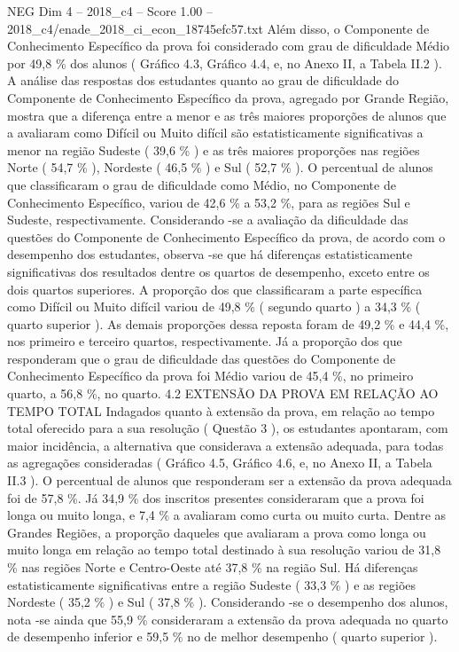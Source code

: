 \begin{textsample}{NEG Dim 4 – 2018\_c4 – Score 1.00 – 2018\_c4/enade\_2018\_ci\_econ\_18745efc57.txt}
Além disso, o Componente de Conhecimento Específico da prova foi considerado com grau de dificuldade Médio por 49,8 \% dos alunos ( Gráfico 4.3, Gráfico 4.4, e, no Anexo II, a Tabela II.2 ).
A análise das respostas dos estudantes quanto ao grau de dificuldade do Componente de Conhecimento Específico da prova, agregado por Grande Região, mostra que a diferença entre a menor e as três maiores proporções de alunos que a avaliaram como Difícil ou Muito difícil são estatisticamente significativas a menor na região Sudeste ( 39,6 \% ) e as três maiores proporções nas regiões Norte ( 54,7 \% ), Nordeste ( 46,5 \% ) e Sul ( 52,7 \% ).
O percentual de alunos que classificaram o grau de dificuldade como Médio, no Componente de Conhecimento Específico, variou de 42,6 \% a 53,2 \%, para as regiões Sul e Sudeste, respectivamente.
Considerando -se a avaliação da dificuldade das questões do Componente de Conhecimento Específico da prova, de acordo com o desempenho dos estudantes, observa -se que há diferenças estatisticamente significativas dos resultados dentre os quartos de desempenho, exceto entre os dois quartos superiores.
A proporção dos que classificaram a parte específica como Difícil ou Muito difícil variou de 49,8 \% ( segundo quarto ) a 34,3 \% ( quarto superior ).
As demais proporções dessa reposta foram de 49,2 \% e 44,4 \%, nos primeiro e terceiro quartos, respectivamente.
Já a proporção dos que responderam que o grau de dificuldade das questões do Componente de Conhecimento Específico da prova foi Médio variou de 45,4 \%, no primeiro quarto, a 56,8 \%, no quarto. 4.2 EXTENSÃO DA PROVA EM RELAÇÃO AO TEMPO TOTAL Indagados quanto à extensão da prova, em relação ao tempo total oferecido para a sua resolução ( Questão 3 ), os estudantes apontaram, com maior incidência, a alternativa que considerava a extensão adequada, para todas as agregações consideradas ( Gráfico 4.5, Gráfico 4.6, e, no Anexo II, a Tabela II.3 ).
O percentual de alunos que responderam ser a extensão da prova adequada foi de 57,8 \%.
Já 34,9 \% dos inscritos presentes consideraram que a prova foi longa ou muito longa, e 7,4 \% a avaliaram como curta ou muito curta.
Dentre as Grandes Regiões, a proporção daqueles que avaliaram a prova como longa ou muito longa em relação ao tempo total destinado à sua resolução variou de 31,8 \% nas regiões Norte e Centro-Oeste até 37,8 \% na região Sul.
Há diferenças estatisticamente significativas entre a região Sudeste ( 33,3 \% ) e as regiões Nordeste ( 35,2 \% ) e Sul ( 37,8 \% ).
Considerando -se o desempenho dos alunos, nota -se ainda que 55,9 \% consideraram a extensão da prova adequada no quarto de desempenho inferior e 59,5 \% no de melhor desempenho ( quarto superior ).

\end{textsample}
